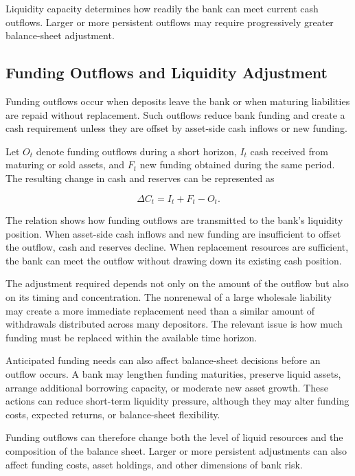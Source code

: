 Liquidity capacity determines how readily the bank can meet current cash outflows. Larger or more persistent outflows may require progressively greater balance-sheet adjustment.

\subsection{Funding Outflows and Liquidity Adjustment}

Funding outflows occur when deposits leave the bank or when maturing liabilities are repaid without replacement. Such outflows reduce bank funding and create a cash requirement unless they are offset by asset-side cash inflows or new funding.

Let $O_t$ denote funding outflows during a short horizon, $I_t$ cash received from maturing or sold assets, and $F_t$ new funding obtained during the same period. The resulting change in cash and reserves can be represented as

\begin{equation}
\Delta C_t=I_t+F_t-O_t.
\label{eq:ch12-liquidity-adjustment}
\end{equation}

The relation shows how funding outflows are transmitted to the bank's liquidity position. When asset-side cash inflows and new funding are insufficient to offset the outflow, cash and reserves decline. When replacement resources are sufficient, the bank can meet the outflow without drawing down its existing cash position.

The adjustment required depends not only on the amount of the outflow but also on its timing and concentration. The nonrenewal of a large wholesale liability may create a more immediate replacement need than a similar amount of withdrawals distributed across many depositors. The relevant issue is how much funding must be replaced within the available time horizon.

Anticipated funding needs can also affect balance-sheet decisions before an outflow occurs. A bank may lengthen funding maturities, preserve liquid assets, arrange additional borrowing capacity, or moderate new asset growth. These actions can reduce short-term liquidity pressure, although they may alter funding costs, expected returns, or balance-sheet flexibility.

Funding outflows can therefore change both the level of liquid resources and the composition of the balance sheet. Larger or more persistent adjustments can also affect funding costs, asset holdings, and other dimensions of bank risk.

